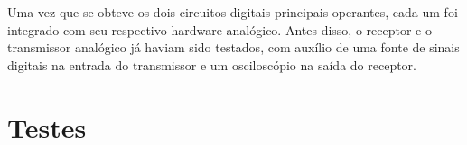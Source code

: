 	Uma vez que se obteve os dois circuitos digitais principais operantes, cada um foi integrado com seu respectivo hardware analógico. Antes disso, o receptor e o transmissor analógico já haviam sido testados, com auxílio de uma fonte de sinais digitais na entrada do transmissor e um osciloscópio na saída do receptor.
	
	\section{Testes}
